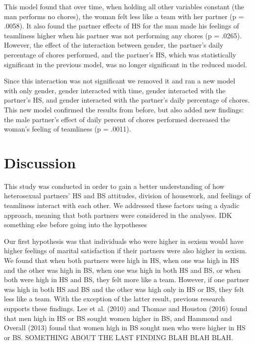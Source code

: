 \documentclass[
  man]{apa6}
\begin{document}
This model found that over time, when holding all other variables constant (the man performs no chores), the woman felt less like a team with her partner (p = .0058). It also found the partner effects of HS for the man made his feelings of teamliness higher when his partner was not performing any chores (p = .0265). However, the effect of the interaction between gender, the partner's daily percentage of chores performed, and the partner's HS, which was statistically significant in the previous model, was no longer significant in the reduced model.

Since this interaction was not significant we removed it and ran a new model with only gender, gender interacted with time, gender interacted with the partner's HS, and gender interacted with the partner's daily percentage of chores. This new model confirmed the results from before, but also added new findings: the male partner's effect of daily percent of chores performed decreased the woman's feeling of teamliness (p = .0011).

\hypertarget{discussion}{%
\section{Discussion}\label{discussion}}

This study was conducted in order to gain a better understanding of how heterosexual partners' HS and BS attitudes, division of housework, and feelings of teamliness interact with each other. We addressed these factors using a dyadic approach, meaning that both partners were considered in the analyses. IDK something else before going into the hypotheses

Our first hypothesis was that individuals who were higher in sexism would have higher feelings of marital satisfaction if their partners were also higher in sexism. We found that when both partners were high in HS, when one was high in HS and the other was high in BS, when one was high in both HS and BS, or when both were high in HS and BS, they felt more like a team. However, if one partner was high in both HS and BS and the other was high only in HS or BS, they felt less like a team. With the exception of the latter result, previous research supports these findings. Lee et al. (2010) and Thomae and Houston (2016) found that men high in HS or BS sought women higher in BS, and Hammond and Overall (2013) found that women high in BS sought men who were higher in HS or BS. SOMETHING ABOUT THE LAST FINDING BLAH BLAH BLAH.
\end{document}
